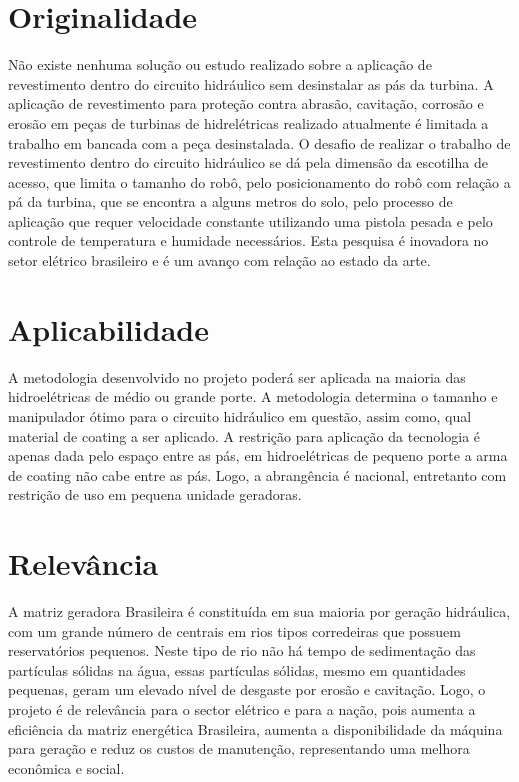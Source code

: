 \section{Originalidade}

Não existe nenhuma solução ou estudo realizado sobre a aplicação de revestimento
dentro do circuito hidráulico sem desinstalar as pás da turbina. A aplicação de
revestimento para proteção contra abrasão, cavitação, corrosão e erosão em peças
de turbinas de hidrelétricas realizado atualmente é limitada a trabalho em
bancada com a peça desinstalada. O desafio de realizar o trabalho de
revestimento dentro do circuito hidráulico se dá pela dimensão da escotilha de
acesso, que limita o tamanho do robô, pelo posicionamento do robô com relação a
pá da turbina, que se encontra a alguns metros do solo, pelo processo de
aplicação que requer velocidade constante utilizando uma pistola pesada e pelo
controle de temperatura e humidade necessários. Esta pesquisa é inovadora no
setor elétrico brasileiro e é um avanço com relação ao estado da arte.

\section{Aplicabilidade}

A metodologia desenvolvido no projeto  poderá ser aplicada na maioria das
hidroelétricas de médio ou grande porte. A metodologia determina o tamanho e
manipulador ótimo para o circuito hidráulico em questão, assim como, qual
material de coating a ser aplicado. A restrição para aplicação da tecnologia é
apenas dada pelo espaço entre as pás, em hidroelétricas de pequeno porte a arma
de coating não cabe entre as pás. Logo, a abrangência é nacional, entretanto com
restrição de uso em pequena unidade geradoras.

\section{Relevância}

A matriz geradora Brasileira é constituída em sua maioria por geração
hidráulica, com um grande número de centrais em rios tipos corredeiras que
possuem reservatórios pequenos. Neste tipo de rio não há tempo de sedimentação
das partículas sólidas na água, essas partículas sólidas, mesmo em quantidades
pequenas, geram um elevado nível de desgaste por erosão e cavitação. Logo, o
projeto é de relevância para o sector elétrico e para a nação, pois aumenta a
eficiência da matriz energética Brasileira, aumenta a disponibilidade da máquina
para geração e reduz os custos de manutenção, representando uma melhora
econômica e social.

